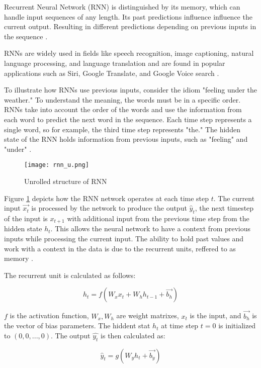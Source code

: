 Recurrent Neural Network (RNN) is distinguished by its memory, which can handle input sequences of any length. Its past predictions influence influence the current output. Resulting in different predictions depending on previous inputs in the sequence \cite{rnnDSmedium}.

RNNs are widely used in fields like speech recognition, image captioning, natural language processing, and language translation and are found in popular applications such as Siri, Google Translate, and Google Voice search \cite{ibmrnn}.

To illustrate how RNNs use previous inputs, consider the idiom "feeling under the weather." To understand the meaning, the words must be in a specific order. RNNs take into account the order of the words and use the information from each word to predict the next word in the sequence. Each time step represents a single word, so for example, the third time step represents "the." The hidden state of the RNN holds information from previous inputs, such as "feeling" and "under" \cite{ibmrnn}.

\begin{figure}[h]
    \centering
    \texttt{[image: rnn\_u.png]}
    \caption{Unrolled structure of RNN \cite{matous}}
    \label{fig:rnn}
\end{figure}


Figure \ref{fig:rnn} depicts how the RNN network operates at each time step $t$. The current input $\vec{x_t}$ is processed by the network to produce the output $\hat{y}_t$, the next timestep of the input is $x_{t+1}$ with additional input from the previous time step from the hidden state $h_{t}$. This allows the neural network to have a context from previous inputs while processing the current input. The ability to hold past values and work with a context in the data is due to the recurrent units, reffered to as memory \cite{rnnin6}.

The recurrent unit is calculated as follows:

\begin{equation}
    {h_t = f(W_{x}x_t + W_{h}h_{t-1}+\vec{b_h})}
\end{equation}

$f$ is the activation function, $W_x,W_h$ are weight matrixes, $x_t$ is the input, and $\vec{b_h}$ is the vector of bias parameters. The hiddent stat $h_t$ at time step $t=0$ is initialized to $(0,0,...,0)$. The output $\hat{y_t}$ is then calculated as:

\begin{equation}
    {\hat{y}_t = g(W_{y}h_t + \vec{b_y})}
\end{equation}

